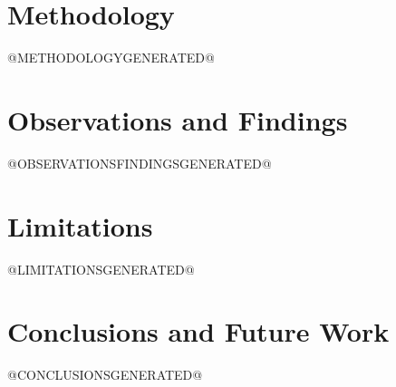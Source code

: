 \documentclass[a4paper, 12pt]{report}
\begin{document}
\chapter{Methodology}
@METHODOLOGYGENERATED@

\chapter{Observations and Findings}
@OBSERVATIONSFINDINGSGENERATED@

\chapter{Limitations}
@LIMITATIONSGENERATED@

\chapter{Conclusions and Future Work}
@CONCLUSIONSGENERATED@





\end{document}
